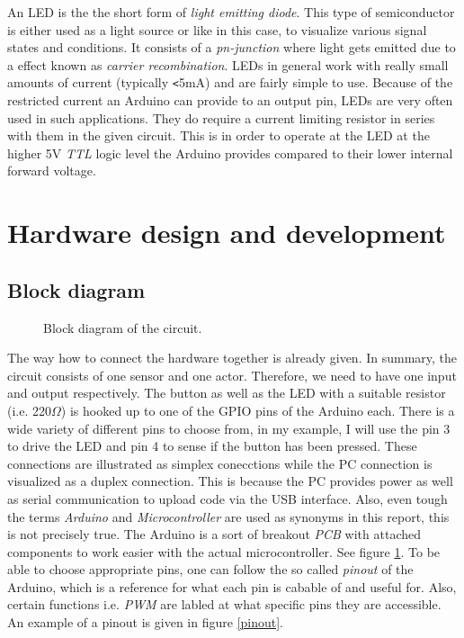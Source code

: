 \documentclass{scrartcl}                    %
\begin{document}
    An LED is the the short form of \emph{light emitting diode}. This type of semiconductor is either used as a light source or like in this case, to visualize various signal states and conditions. It consists of a \emph{pn-junction} where light gets emitted due to a effect known as \emph{carrier recombination}. LEDs in general work with really small amounts of current (typically \verb|<|5mA) and are fairly simple to use. Because of the restricted current an Arduino can provide to an output pin, LEDs are very often used in such applications. They do require a current limiting resistor in series with them in the given circuit. This is in order to operate at the LED at the higher 5V \emph{TTL} logic level the Arduino provides compared to their lower internal forward voltage.

    \newpage
    
\section{Hardware design and development}
    \subsection{Block diagram}

    \begin{figure}
        \centering
        
        \caption{Block diagram of the circuit. \cite{block}}
        \label{block_diagram}
    \end{figure}

    The way how to connect the hardware together is already given. In summary, the circuit consists of one sensor and one actor. Therefore, we need to have one input and output respectively. The button as well as the LED with a suitable resistor (i.e. 220\(\Omega\)) is hooked up to one of the GPIO pins of the Arduino each. There is a wide variety of different pins to choose from, in my example, I will use the pin 3 to drive the LED and pin 4 to sense if the button has been pressed. These connections are illustrated as simplex conecctions while the PC connection is visualized as a duplex connection. This is because the PC provides power as well as serial communication to upload code via the USB interface. Also, even tough the terms \emph{Arduino} and \emph{Microcontroller} are used as synonyms in this report, this is not precisely true. The Arduino is a sort of breakout \emph{PCB} with attached components to work easier with the actual microcontroller. See figure \ref{block_diagram}. To be able to choose appropriate pins, one can follow the so called \emph{pinout} of the Arduino, which is a reference for what each pin is cabable of and useful for. Also, certain functions i.e. \emph{PWM} are labled at what specific pins they are accessible. An example of a pinout is given in figure \ref{pinout}. 
\end{document}
